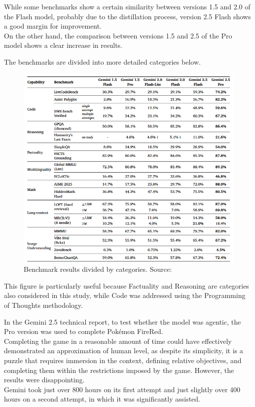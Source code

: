 \documentclass[12pt]{article}
\begin{document}
While some benchmarks show a certain similarity between versions 1.5 and 2.0 of the Flash model, probably due to the distillation process, version 2.5 Flash shows a good margin for improvement.\\
On the other hand, the comparison between versions 1.5 and 2.5 of the Pro model shows a clear increase in results.

The benchmarks are divided into more detailed categories below. 
    
    \begin{figure}[H]
    \centering
            \includegraphics[width=1\textwidth]{TableGeminiBenchmarks.png}
    \caption[Detailed table of Gemini benchmarks]{Benchmark results divided by categories. Source: \cite{comanici2025gemini25pushingfrontier}}
    \end{figure}    
    
This figure is particularly useful because Factuality and Reasoning are categories also considered in this study, while Code was addressed using the Programming of Thoughts methodology.    

In the Gemini 2.5 technical report, to test whether the model was agentic, the Pro version was used to complete Pokémon FireRed.\\
Completing the game in a reasonable amount of time could have effectively demonstrated an approximation of human level, as despite its simplicity, it is a puzzle that requires immersion in the context, defining relative objectives, and completing them within the restrictions imposed by the game. However, the results were disappointing.\\
Gemini took just over 800 hours on its first attempt and just slightly over 400 hours on a second attempt, in which it was significantly assisted.\cite{comanici2025gemini25pushingfrontier}
\end{document}

